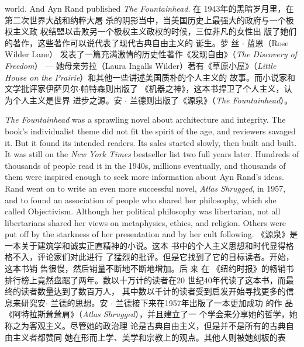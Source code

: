 \begin{paracol}{2}
world. And Ayn Rand published \textit{The Fountainhead}.
\switchcolumn
在 1943年的黑暗岁月里，在第二次世界大战和纳粹大屠
杀的阴影当中，当美国历史上最强大的政府与一个极权主义政
权结盟以击败另一个极权主义政权的时候，三位非凡的女性出
版了她们的著作，这些著作可以说代表了现代古典自由主义的
诞生。萝 丝 $\cdot$ 蓝恩（Rose Wilder Lane） 发表了一篇充满激情的历史性著作《发现自由》（\textit{The Discovery of Freedom}） ---
她母亲劳拉（Laura Ingalls Wilder）著有《草原小屋》（\textit{Little House on the Prairie}）和其他一些讲述美国质朴的个人主义的
故事。而小说家和文学批评家伊萨贝尔$\cdot$帕特森则出版了
《机器之神》，这本书捍卫了个人主义，认为个人主义是世界
进步之源。安 $\cdot$ 兰德则出版了《源泉》（\textit{The Fountainhead}）。

\textit{The Fountainhead} was a sprawling novel about architecture and
integrity. The book's individualist theme did not fit the spirit of
the age, and reviewers savaged it. But it found its intended
readers. Its sales started slowly, then built and built. It was still
on the \textit{New York Times} bestseller list two full years later. Hundreds of thousands of people read it in the 1940s, millions eventually, and thousands of them were inspired enough to seek
more information about Ayn Rand's ideas. Rand went on to
write an even more successful novel, \textit{Atlas Shrugged}, in 1957,
and to found an association of people who shared her philosophy, which she called Objectivism. Although her political philosophy was libertarian, not all libertarians shared her views on
metaphysics, ethics, and religion. Others were put off by the
starkness of her presentation and by her cult following.
\switchcolumn
《源泉》是一本关于建筑学和诚实正直精神的小说。这本
书中的个人主义思想和时代显得格格不入，评论家们对此进行
了猛烈的批评。但是它找到了它的目标读者。开始，这本书销
售很慢，然后销量不断地不断地增加。后 来 在 《纽约时报》的畅销书排行榜上竟然盘踞了两年。数以十万计的读者在20
世纪40年代读了这本书，而最终的读者数量达到了数百万人，
其中数以千计的读者受到启发开始寻找更多的信息来研究安$\cdot$
兰德的思想。安 $\cdot$ 兰德接下来在1957年出版了一本更加成功
的作 品《阿特拉斯耸耸肩》（\textit{Atlas Shrugged}），并且建立了一
个学会来分享她的哲学，她称之为客观主义。尽管她的政治理
论是古典自由主义，但是并不是所有的古典自由主义者都赞同
她在形而上学、美学和宗教上的观点。其他人则被她刻板的表

\end{paracol}

